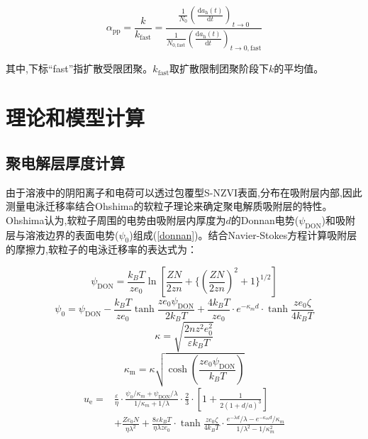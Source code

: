 \begin{equation}\label{alpha_ppexp}
  \alpha_{\mathrm{pp}}=\frac{k}{k_{\mathrm{fast}}}=\frac{\frac{1}{N_0}\left(\frac{\mathrm{d}a_\mathrm{h}(t)}{\mathrm{d}t}\right)_{t\rightarrow0}}{\frac{1}{N_{0,\mathrm{fast}}}\left(\frac{\mathrm{d}a_\mathrm{h}(t)}{\mathrm{d}t}\right)_{t\rightarrow0,\mathrm{fast}}}
\end{equation}

其中,下标“fast”指扩散受限团聚。$k_{\mathrm{fast}}$取扩散限制团聚阶段下$k$的平均值。

\section{理论和模型计算}

\subsection{聚电解层厚度计算}

由于溶液中的阴阳离子和电荷可以透过包覆型S-NZVI表面,分布在吸附层内部,因此测量电泳迁移率结合Ohshima的软粒子理论来确定聚电解质吸附层的特性。Ohshima认为,软粒子周围的电势由吸附层内厚度为$d$的Donnan电势($\psi_\mathrm{DON}$)和吸附层与溶液边界的表面电势($\psi_\mathrm{0}$)组成\cite{2006315,OHSHIMA20152,Ohshima1995}(\cref{donnan})。结合Navier-Stokes方程计算吸附层的摩擦力,软粒子的电泳迁移率的表达式为\cite{Oshima1992}：

\begin{equation}\label{psidon}
    \psi _\mathrm{DON}=\frac{k_BT}{ze_0}\ln[\frac{ZN}{2zn}+\{(\frac{ZN}{2zn})^2+1\}^{1/2}]
\end{equation}
\begin{equation}\label{psi0}
    \psi_0=\psi_\mathrm{DON}-\frac{k_BT}{ze_0}\tanh\frac{ze_0\psi_\mathrm{DON}}{2k_BT}+\frac{4k_BT}{ze_0}\cdot e^{-\kappa_md}\cdot\tanh\frac{ze_0\zeta }{4k_BT}
\end{equation}
\begin{equation}
    \kappa=\sqrt{\frac{2nz^2e_0^2}{\varepsilon k_B T}}
\end{equation}
\begin{equation}
    \kappa_\mathrm{m}=\kappa\sqrt{\cosh(\frac{ze_0\psi_\mathrm{DON}}{k_BT})}
\end{equation}
\begin{align}\label{ue}
    u_\mathrm{e}=&\frac{\varepsilon}{\eta }\cdot\frac{\psi _0/\kappa _m+\psi _\mathrm{DON}/\lambda }{1/\kappa _m+1/\lambda }\cdot\frac{2}{3}\cdot[1+\frac{1}{2(1+d/a)^3}]\\ &+\frac{Ze_0N}{\eta \lambda ^2}+\frac{8\varepsilon k_BT}{\eta \lambda ze_0}\cdot\tanh \frac{ze_0\zeta}{4k_BT}\cdot\frac{e^{-\lambda d}/\lambda -e^{-\kappa _md}/\kappa _m}{1/\lambda ^2-1/\kappa _m^2}\nonumber
\end{align}

